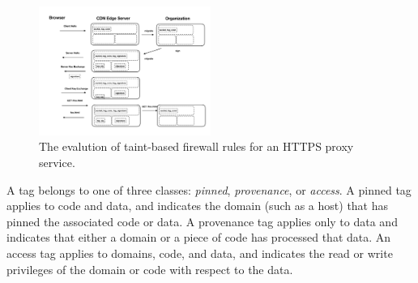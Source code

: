 \begin{figure}[t]
	\centering
    \includegraphics[width=0.5\textwidth]{figs/https-flowchart}
    \caption{The evalution of taint-based firewall rules for an HTTPS proxy
    service.}
	\label{fig:https-flowchart}
\end{figure}





A tag belongs to one of three classes: \emph{pinned}, \emph{provenance},
or \emph{access}.
%
A pinned tag applies to code and data, and indicates the domain (such
as a host) that has pinned the associated code or data.
%
A provenance tag applies only to data and indicates that either a domain or a piece of
code has processed that data.
%
An access tag applies to domains, code, and data, and indicates the read or
write privileges of the domain or code with respect to the data.


